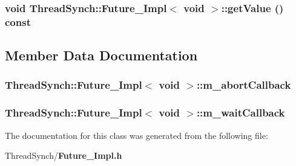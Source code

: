 \subsubsection{\setlength{\rightskip}{0pt plus 5cm}void {\bf Thread\-Synch::Future\_\-Impl}$<$ void $>$::get\-Value () const\hspace{0.3cm}{\tt  [inline]}}\label{class_thread_synch_1_1_future___impl_3_01void_01_4_5d4fed5f6d00be839a9a39feaa75a6a0}




\subsection{Member Data Documentation}
\subsubsection{ {\bf Thread\-Synch::Future\_\-Impl}$<$ void $>$::{\bf m\_\-abort\-Callback}\hspace{0.3cm}{\tt  [private]}}\label{class_thread_synch_1_1_future___impl_3_01void_01_4_9c311414b820a98e38cf40956382540b}


\subsubsection{ {\bf Thread\-Synch::Future\_\-Impl}$<$ void $>$::{\bf m\_\-wait\-Callback}\hspace{0.3cm}{\tt  [private]}}\label{class_thread_synch_1_1_future___impl_3_01void_01_4_d0c8384eb7f0d507b1391ba0084f3cbd}




The documentation for this class was generated from the following file:\begin{CompactItemize}
\item 
Thread\-Synch/{\bf Future\_\-Impl.h}\end{CompactItemize}
